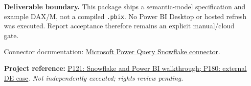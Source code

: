 \documentclass[11pt,twoside]{article}
\newcommand{\repo}[2]{\par\begingroup\fontsize{8.0}{9.6}\selectfont\sffamily\color{inkgray}\textbf{Project reference:} \href{#2}{#1}. \textit{Not independently executed; rights review pending.}\par\endgroup}
\begin{document}
\begin{insight}\textbf{Deliverable boundary.} This package ships a semantic-model specification and example DAX/M, not a compiled \texttt{.pbix}. No Power BI Desktop or hosted refresh was executed. Report acceptance therefore remains an explicit manual/cloud gate.\end{insight}
{\fontsize{8}{9.5}\selectfont\color{inkgray}Connector documentation: \href{https://learn.microsoft.com/en-us/power-query/connectors/snowflake}{Microsoft Power Query Snowflake connector}.}\par
\repo{P121: Snowflake and Power BI walkthrough; P180: external DE case}{https://github.com/Snowflake-Labs/sfguide-end-to-end-analytics-with-snowflake-and-power-bi}

\newpage

\end{document}

